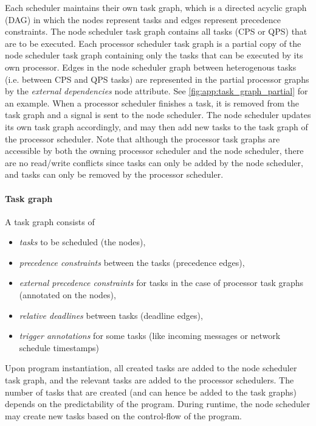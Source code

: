 Each scheduler maintains their own task graph,
which is a directed acyclic graph (DAG) in which the nodes represent tasks and edges represent precedence constraints.
The node scheduler task graph contains all tasks (CPS or QPS) that are to be executed.
Each processor scheduler task graph is a partial copy of the node scheduler task graph containing only the tasks that can be executed by its own processor.
Edges in the node scheduler graph between heterogenous tasks (i.e. between CPS and QPS tasks) are represented in the partial processor graphs by the \textit{external dependencies} node attribute. See \cref{fig:app:task_graph_partial} for an example.
When a processor scheduler finishes a task, it is removed from the task graph and a signal is sent to the node scheduler.
The node scheduler updates its own task graph accordingly, and may then add new tasks to the task graph of the processor scheduler.
Note that although the processor task graphs are accessible by both the owning processor scheduler and the node scheduler, there are no read/write conflicts
since tasks can only be added by the node scheduler, and tasks can only be removed by the processor scheduler.

\paragraph{Task graph}
A task graph consists of 
\begin{itemize}
\item \textit{tasks} to be scheduled (the nodes),
\item \textit{precedence constraints} between the tasks (precedence edges),
\item \textit{external precedence constraints} for tasks in the case of processor task graphs (annotated on the nodes),
\item \textit{relative deadlines} between tasks (deadline edges),
\item \textit{trigger annotations} for some tasks (like incoming messages or network schedule timestamps)
\end{itemize}


Upon program instantiation, all created tasks are added to the node scheduler task graph, and the relevant tasks are added to the processor schedulers.
The number of tasks that are created (and can hence be added to the task graphs) depends on the predictability of the program.
During runtime, the node scheduler may create new tasks based on the control-flow of the program.

